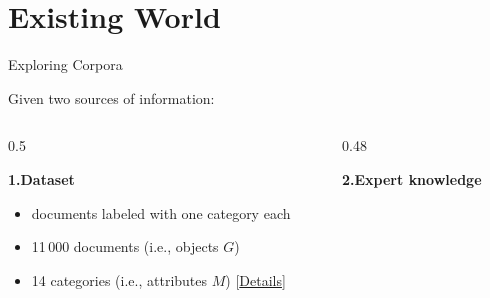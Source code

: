 \section{Existing World}

\begin{frame}{Exploring Corpora}

\hypertarget{main:dataset-overview}{}

Given two sources of information:


\begin{columns}[T,onlytextwidth]

\begin{column}{0.5\textwidth}

\textbf{1.\quad Dataset}

\vspace{0.2em}
\begin{itemize}
    \item<2-> documents labeled with one category each
    \item<3-> 11\,000 documents
          (i.e., objects $G$)
    \item<3-> 14 categories
          (i.e., attributes $M$)
          {\tiny[\hyperlink{appendix:dataset-detail}{Details}]}
\end{itemize}
\vspace{-1em}
\end{column}

\begin{column}{0.48\textwidth}


\textbf{2.\quad Expert knowledge}


\end{column}

\end{columns}

\end{frame}

